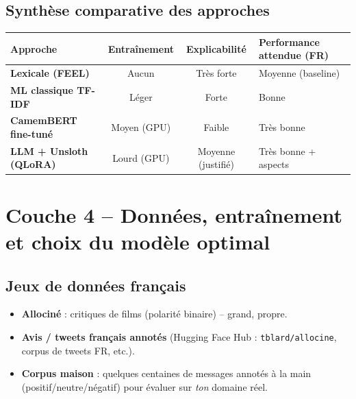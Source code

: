 \documentclass[11pt,a4paper]{article}
\newcommand{\code}[1]{\texttt{\small #1}}
\begin{document}
\subsection{Synthèse comparative des approches}
\begin{center}
\small
\begin{tabularx}{\linewidth}{>{\bfseries}l c c X}
\toprule
Approche & Entraînement & Explicabilité & Performance attendue (FR) \\
\midrule
Lexicale (FEEL) & Aucun & Très forte & Moyenne (baseline) \\
ML classique TF-IDF & Léger & Forte & Bonne \\
CamemBERT fine-tuné & Moyen (GPU) & Faible & Très bonne \\
LLM + Unsloth (QLoRA) & Lourd (GPU) & Moyenne (justifié) & Très bonne + aspects \\
\bottomrule
\end{tabularx}
\end{center}

\section{Couche 4 -- Données, entraînement et choix du modèle optimal}

\subsection{Jeux de données français}
\begin{itemize}[leftmargin=1.2cm,nosep]
  \item \textbf{Allociné} : critiques de films (polarité binaire) -- grand, propre.
  \item \textbf{Avis / tweets français annotés} (Hugging Face Hub : \code{tblard/allocine},
        corpus de tweets FR, etc.).
  \item \textbf{Corpus maison} : quelques centaines de messages annotés à la main
        (positif/neutre/négatif) pour évaluer sur \emph{ton} domaine réel.
\end{itemize}
\end{document}
